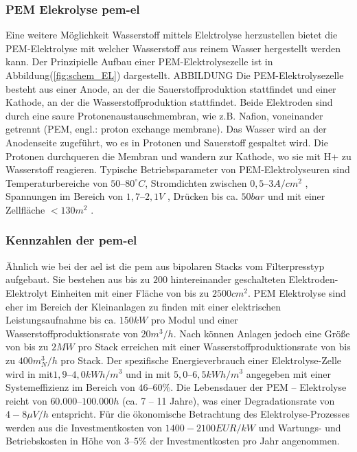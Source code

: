 \documentclass[onecolumn,10pt,titlepage]{article}
\begin{document}
			\subsubsection*{PEM Elekrolyse \gls{pem}-\gls{el}}
			Eine weitere Möglichkeit Wasserstoff mittels Elektrolyse herzustellen bietet die PEM-Elektrolyse mit welcher Wasserstoff aus reinem Wasser hergestellt werden kann. Der Prinzipielle Aufbau einer PEM-Elektrolysezelle ist in Abbildung(\ref{fig:schem_EL}) dargestellt.
			ABBILDUNG
			Die PEM-Elektrolysezelle besteht aus einer Anode, an der die Sauerstoffproduktion stattfindet und einer Kathode, an der die Wasserstoffproduktion stattfindet.\cite{Smolinka.05.07.2011} Beide Elektroden sind durch eine saure Protonenaustauschmembran, wie z.B. Nafion, voneinander getrennt (PEM, engl.: proton exchange membrane). Das Wasser wird an der Anodenseite zugeführt, wo es in Protonen und Sauerstoff gespaltet wird.\cite{Kurzweil.2015} Die Protonen durchqueren die Membran und wandern zur Kathode, wo sie mit H+ zu Wasserstoff reagieren.
			Typische Betriebsparameter von PEM-Elektrolyseuren sind Temperaturbereiche von $50–80 ^\circ C$, Stromdichten zwischen $0,5–3 A/cm^2$ \cite{EspinosaLopez.2018}, Spannungen im Bereich von $1,7–2,1 V$ \cite{Kurzweil.2015}, Drücken bis ca. $50 bar$ und mit einer Zellfläche $<130 m^2$ \cite{Buttler.2018}.

			\subsubsection*{Kennzahlen der \gls{pem}-\gls{el}}
			Ähnlich wie bei der \gls{ael} ist die \gls{pem} aus bipolaren Stacks vom Filterpresstyp aufgebaut. Sie bestehen aus bis zu $200$ hintereinander geschalteten Elektroden-Elektrolyt Einheiten mit einer Fläche von bis zu $2500 cm^2$.\cite{Kurzweil.2015} PEM Elektrolyse sind eher im Bereich der Kleinanlagen zu finden mit einer elektrischen Leistungsaufnahme bis ca. $150 kW$ pro Modul \cite{Smolinka.05.07.2011} und einer Wasserstoffproduktionsrate von $20 m^3/h$.\cite{Kurzweil.2015} Nach \cite{Buttler.2018} können Anlagen jedoch eine Größe von bis zu $2 MW$ pro Stack erreichen mit einer Wasserstoffproduktionsrate von bis zu $400 m^3_N/h$ pro Stack.
			Der spezifische Energieverbrauch einer Elektrolyse-Zelle wird in \cite{Kurzweil.2015} mit$ 1,9–4,0 kWh/m^3$ und in \cite{Buttler.2018} mit $5,0–6,5 kWh/m^3$ angegeben mit einer Systemeffizienz im Bereich von $46–60\%.$ Die Lebensdauer der PEM – Elektrolyse reicht von $60.000–100.000h$ (ca. 7 – 11 Jahre), was einer Degradationsrate von $4-8 \mu V/h$ entspricht. Für die ökonomische Betrachtung des Elektrolyse-Prozesses werden aus \cite{Buttler.2018} die Investmentkosten von $1400-2100 EUR/kW$ und Wartungs- und Betriebskosten in Höhe von $3–5 \%$ der Investmentkosten pro Jahr angenommen.
\end{document}
